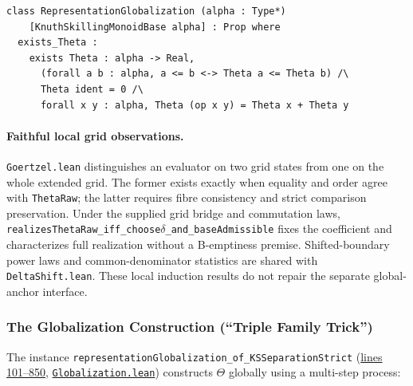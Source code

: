 \documentclass[11pt]{article}
\theoremstyle{definition}
\theoremstyle{remark}
\begin{document}
\begin{lstlisting}[caption={RepresentationGlobalization typeclass}]
class RepresentationGlobalization (alpha : Type*)
    [KnuthSkillingMonoidBase alpha] : Prop where
  exists_Theta :
    exists Theta : alpha -> Real,
      (forall a b : alpha, a <= b <-> Theta a <= Theta b) /\
      Theta ident = 0 /\
      forall x y : alpha, Theta (op x y) = Theta x + Theta y
\end{lstlisting}

\paragraph{Faithful local grid observations.}
\texttt{Goertzel.lean} distinguishes an evaluator on two grid states from one on the
whole extended grid. The former exists exactly when equality and order agree with
\texttt{ThetaRaw}; the latter requires fibre consistency and strict comparison preservation.
Under the supplied grid bridge and commutation laws,
\texttt{realizesThetaRaw\_iff\_choose$\delta$\_and\_baseAdmissible} fixes the coefficient
and characterizes full realization without a B-emptiness premise. Shifted-boundary
power laws and common-denominator statistics are shared with \texttt{DeltaShift.lean}.
These local induction results do not repair the separate global-anchor interface.

\subsubsection{The Globalization Construction (``Triple Family Trick'')}

The instance \texttt{representationGlobalization\_of\_KSSeparationStrict} (\href{https://github.com/zariuq/ks-foundations-of-inference/blob/main/KnuthSkilling/Additive/Proofs/GridInduction/Globalization.lean\#L101-L850}{lines 101--850}, \href{https://github.com/zariuq/ks-foundations-of-inference/blob/main/KnuthSkilling/Additive/Proofs/GridInduction/Globalization.lean}{\texttt{Globalization.lean}})
constructs $\Theta$ globally using a multi-step process:
\end{document}
